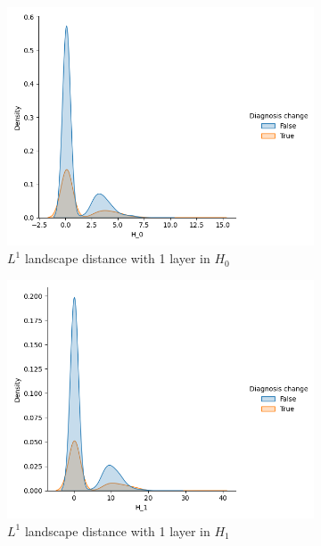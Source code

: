 \documentclass{article}
\begin{document}
\begin{figure}[htb]
\begin{subfigure}{0.32\textwidth}
    \includegraphics[width=\textwidth]{figures/temporal_evolution/landscape_H_0_dist_diag_change.png}
    \caption{$L^{1}$ landscape distance with 1 layer in $H_0$}
  \end{subfigure}
  \begin{subfigure}{0.32\textwidth}
    \includegraphics[width=\textwidth]{figures/temporal_evolution/landscape_H_1_dist_diag_change.png}
    \caption{$L^{1}$ landscape distance with 1 layer in $H_1$}
  \end{subfigure}
  \begin{subfigure}{0.32\textwidth}

\end{subfigure}
\end{figure}
\end{document}
